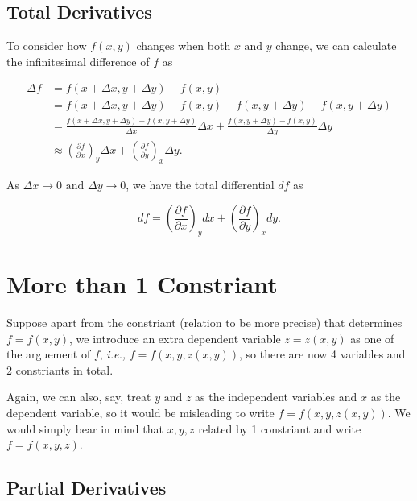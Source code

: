 \documentclass[english,a4paper,12pt]{report}
\begin{document}
\subsection{Total Derivatives}

To consider how \(f(x,y)\) changes when both \(x \text { and } y\) change, we can calculate the infinitesimal difference of \(f\) as 

\begin{equation} \label{totaldf} 
    \begin{aligned}
        \Delta f &= f(x+\Delta x,y+\Delta y) - f(x,y) \\
        &= f(x+\Delta x,y+\Delta y) - f(x,y) + f(x,y+\Delta y) - f(x,y+\Delta y) \\
        &= \frac{f(x+\Delta x,y+\Delta y)-f(x,y+\Delta y)}{\Delta x}\Delta x + \frac{f(x,y+\Delta y)-f(x,y)}{\Delta y} \Delta y \\
        &\approx \left(\frac{\partial f}{\partial x} \right)_{y} \Delta x + \left(\frac{\partial f}{\partial y}\right)_{x}  \Delta y.
    \end{aligned}
\end{equation}

As \(\Delta x \to 0 \text { and } \Delta y \to 0\), we have the total differential \(df\) as 

\begin{equation}
	df = \left( \frac{\partial f}{\partial x} \right)_{y} dx + \left( \frac{\partial f}{\partial y} \right)_{x} dy.  
\end{equation}


\section{More than 1 Constriant}

Suppose apart from the constriant (relation to be more precise) that determines \(f = f(x,y)\), we introduce an extra dependent variable \(z = z(x,y)\) as one of the arguement of \(f\), \textit{i.e.,} \(f = f(x,y,z(x,y))\), so there are now 4 variables and 2 constriants in total. 

Again, we can also, say, treat \(y \text { and } z\) as the independent variables and \(x\) as the dependent variable, so it would be misleading to write \(f=f(x,y,z(x,y))\). We would simply bear in mind that \(x,y,z\) related by 1 constriant and write \(f=f(x,y,z)\). 

\subsection{Partial Derivatives}
\end{document}
